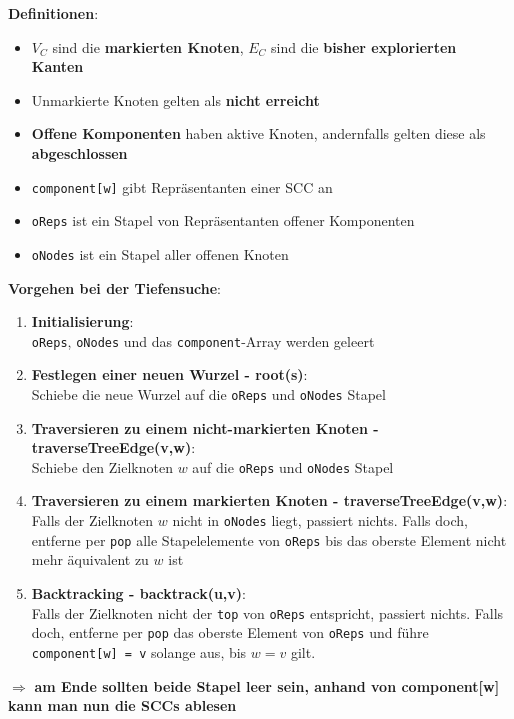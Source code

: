 \textbf{Definitionen}:
\begin{itemize}
	\item $V_C$ sind die \textbf{markierten Knoten}, $E_C$ sind die \textbf{bisher explorierten Kanten}
	\item Unmarkierte Knoten gelten als \textbf{nicht erreicht}
	\item \textbf{Offene Komponenten} haben aktive Knoten, andernfalls gelten diese als \textbf{abgeschlossen}
	\item \texttt{component[w]} gibt Repräsentanten einer SCC an
	\item \texttt{oReps} ist ein Stapel von Repräsentanten offener Komponenten
	\item \texttt{oNodes} ist ein Stapel aller offenen Knoten
\end{itemize}
\textbf{Vorgehen bei der Tiefensuche}:
\begin{enumerate}
	\item \textbf{Initialisierung}:\\\texttt{oReps}, \texttt{oNodes} und das \texttt{component}-Array werden geleert
	\item \textbf{Festlegen einer neuen Wurzel - root(s)}:\\Schiebe die neue Wurzel auf die \texttt{oReps} und \texttt{oNodes} Stapel
	\item \textbf{Traversieren zu einem nicht-markierten Knoten - traverseTreeEdge(v,w)}:\\Schiebe den Zielknoten $w$ auf die \texttt{oReps} und \texttt{oNodes} Stapel
	\item \textbf{Traversieren zu einem markierten Knoten - traverseTreeEdge(v,w)}:\\Falls der Zielknoten $w$ nicht in \texttt{oNodes} liegt, passiert nichts. Falls doch, entferne per \texttt{pop} alle Stapelelemente von \texttt{oReps} bis das oberste Element nicht mehr äquivalent zu $w$ ist
	\item \textbf{Backtracking - backtrack(u,v)}:\\Falls der Zielknoten nicht der \texttt{top} von \texttt{oReps} entspricht, passiert nichts. Falls doch, entferne per \texttt{pop} das oberste Element von \texttt{oReps} und führe \texttt{component[w] = v} solange aus, bis $w = v$ gilt.
\end{enumerate}
$\Rightarrow$ \textbf{am Ende sollten beide Stapel leer sein, anhand von component[w] kann man nun die SCCs ablesen}